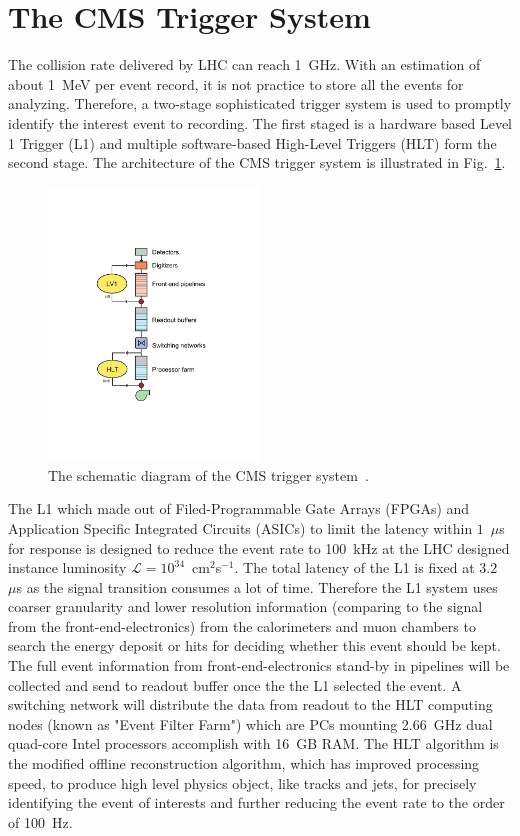 \section{The CMS Trigger System}
The collision rate delivered by LHC can reach 1~GHz. With an estimation of about 1~MeV per event record, it is not practice to store all the events for analyzing. Therefore, a two-stage sophisticated trigger system is used to promptly identify the interest event to recording. The first staged is a hardware based Level 1 Trigger (L1) and multiple software-based High-Level Triggers (HLT) form the second stage. The architecture of the CMS trigger system is illustrated in Fig.~\ref{fig:cms_trigger}. 

\begin{figure}[ht]
  \begin{center}
    \includegraphics[width=0.5\textwidth]{figures/detector/CMS_Trigger.pdf}
  \end{center}
  \caption{The schematic diagram of the CMS trigger system~\cite{Chatrchyan:2009ic}.}
  \label{fig:cms_trigger}
\end{figure}

The L1 which made out of Filed-Programmable Gate Arrays (FPGAs) and Application Specific Integrated Circuits (ASICs) to limit the latency within $1$~$\mu$s for response is designed to reduce the event rate to 100~kHz at the LHC designed instance luminosity $\mathcal{L}=10^{34}$~cm$^2$s$^{-1}$. The total latency of the L1 is fixed at $3.2$~$\mu$s as the signal transition consumes a lot of time. Therefore the L1 system uses coarser granularity and lower resolution information (comparing to the signal from the front-end-electronics) from the calorimeters and muon chambers to search the energy deposit or hits for deciding whether this event should be kept. The full event information from front-end-electronics stand-by in pipelines will be collected and send to readout buffer once the the L1 selected the event. A switching network will distribute the data from readout to the HLT computing nodes (known as "Event Filter Farm") which are PCs mounting 2.66~GHz dual quad-core Intel processors accomplish with 16~GB RAM. The HLT algorithm is the modified offline reconstruction algorithm, which has improved processing speed, to produce high level physics object, like tracks and jets, for precisely identifying the event of interests and further reducing the event rate to the order of 100~Hz. 

